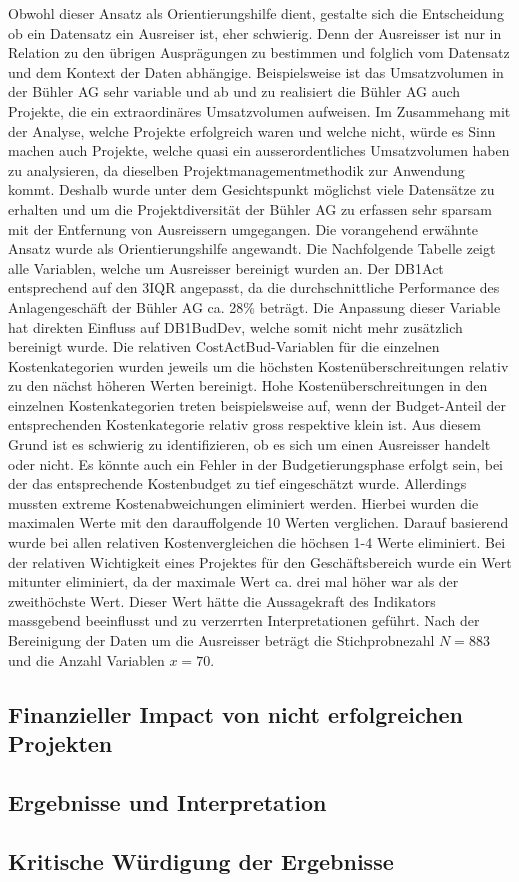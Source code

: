 \newline\newline
Obwohl dieser Ansatz als Orientierungshilfe dient, gestalte sich die Entscheidung ob ein Datensatz ein Ausreiser ist, eher schwierig. Denn der Ausreisser ist nur in Relation zu den übrigen Ausprägungen zu bestimmen und folglich vom Datensatz und dem Kontext der Daten abhängige. Beispielsweise ist das Umsatzvolumen in der Bühler AG sehr variable und ab und zu realisiert die Bühler AG auch Projekte, die ein extraordinäres Umsatzvolumen aufweisen. Im Zusammehang mit der Analyse, welche Projekte erfolgreich waren und welche nicht, würde es Sinn machen auch Projekte, welche quasi ein ausserordentliches Umsatzvolumen haben zu analysieren, da dieselben Projektmanagementmethodik zur Anwendung kommt. Deshalb wurde unter dem Gesichtspunkt möglichst viele Datensätze zu erhalten und um die Projektdiversität der Bühler AG zu erfassen sehr sparsam mit der Entfernung von Ausreissern umgegangen. Die vorangehend erwähnte Ansatz wurde als Orientierungshilfe angewandt. Die Nachfolgende Tabelle zeigt alle Variablen, welche um Ausreisser bereinigt wurden an. Der DB1Act entsprechend auf den 3IQR angepasst, da die durchschnittliche Performance des Anlagengeschäft der Bühler AG ca. 28\% beträgt. Die Anpassung dieser Variable hat direkten Einfluss auf DB1BudDev, welche somit nicht mehr zusätzlich bereinigt wurde. Die relativen CostActBud-Variablen für die einzelnen Kostenkategorien wurden jeweils um die höchsten Kostenüberschreitungen relativ zu den nächst höheren Werten bereinigt. Hohe Kostenüberschreitungen in den einzelnen Kostenkategorien treten beispielsweise auf, wenn der Budget-Anteil der entsprechenden Kostenkategorie relativ gross respektive klein ist. Aus diesem Grund ist es schwierig zu identifizieren, ob es sich um einen Ausreisser handelt oder nicht. Es könnte auch ein Fehler in der Budgetierungsphase erfolgt sein, bei der das entsprechende Kostenbudget zu tief eingeschätzt wurde. Allerdings mussten extreme Kostenabweichungen eliminiert werden. Hierbei wurden die maximalen Werte mit den darauffolgende 10 Werten verglichen. Darauf basierend wurde bei allen relativen Kostenvergleichen die höchsen 1-4 Werte eliminiert. Bei der relativen Wichtigkeit eines Projektes für den Geschäftsbereich wurde ein Wert mitunter eliminiert, da der maximale Wert ca. drei mal höher war als der zweithöchste Wert. Dieser Wert hätte die Aussagekraft des Indikators massgebend beeinflusst und zu verzerrten Interpretationen geführt. Nach der Bereinigung der Daten um die Ausreisser beträgt die Stichprobnezahl $N = 883 $ und die Anzahl Variablen $ x = 70$.
\subsection{Finanzieller Impact von nicht erfolgreichen Projekten}
\subsection{Ergebnisse und Interpretation}
\subsection{Kritische Würdigung der Ergebnisse}
\newpage	
	


